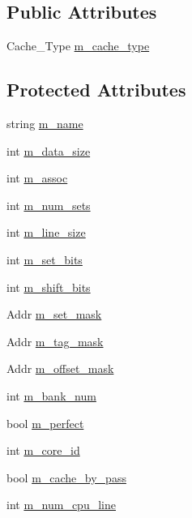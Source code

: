 \subsection*{Public Attributes}
\begin{DoxyCompactItemize}
\item 
Cache\_\-Type \hyperlink{classcache__c_a5d3a5366674d862f4818e2980af21b50}{m\_\-cache\_\-type}
\end{DoxyCompactItemize}
\subsection*{Protected Attributes}
\begin{DoxyCompactItemize}
\item 
string \hyperlink{classcache__c_a6feda51818d2216832b855cd4a36d400}{m\_\-name}
\item 
int \hyperlink{classcache__c_a30907cdb4c4078c28d1210e535d1acdb}{m\_\-data\_\-size}
\item 
int \hyperlink{classcache__c_a1baa2f851f435fb5ecd11ead4f3dcc66}{m\_\-assoc}
\item 
int \hyperlink{classcache__c_a1e7c693df55654e3c37aa5e8fcf80272}{m\_\-num\_\-sets}
\item 
int \hyperlink{classcache__c_ae4a82fe5d53c5b2b6382295628852888}{m\_\-line\_\-size}
\item 
int \hyperlink{classcache__c_a9ad9a67a9325d355365b35aed1c4a77c}{m\_\-set\_\-bits}
\item 
int \hyperlink{classcache__c_a6e91a255d6cc037331a5f2c7e542ea46}{m\_\-shift\_\-bits}
\item 
Addr \hyperlink{classcache__c_a4d0db9dfcbb07b40e41881ca8579f7b0}{m\_\-set\_\-mask}
\item 
Addr \hyperlink{classcache__c_aeebe29c74e5c87fc09e8e13756df31d0}{m\_\-tag\_\-mask}
\item 
Addr \hyperlink{classcache__c_a5ef86cd4af3066379bfc31861acf1e20}{m\_\-offset\_\-mask}
\item 
int \hyperlink{classcache__c_ae0502cb5fca2335260f87efd662a053b}{m\_\-bank\_\-num}
\item 
bool \hyperlink{classcache__c_a1856fce04cc6a1af8bb9865271a12f91}{m\_\-perfect}
\item 
int \hyperlink{classcache__c_a22cdd0ba3fadb28f17b5648e8e66f4ab}{m\_\-core\_\-id}
\item 
bool \hyperlink{classcache__c_ab61f6ec8dca440cb2159d6268f1c2be7}{m\_\-cache\_\-by\_\-pass}
\item 
int \hyperlink{classcache__c_a12bfa9ef1a83b1e4d52c603191580c5d}{m\_\-num\_\-cpu\_\-line}

\end{DoxyCompactItemize}
